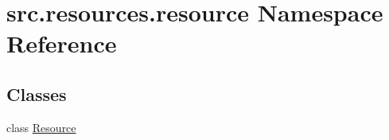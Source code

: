 \hypertarget{namespacesrc_1_1resources_1_1resource}{\section{src.\+resources.\+resource Namespace Reference}
\label{namespacesrc_1_1resources_1_1resource}
}
\subsection*{Classes}
\begin{DoxyCompactItemize}
\item 
class \hyperlink{classsrc_1_1resources_1_1resource_1_1_resource}{Resource}
\end{DoxyCompactItemize}
